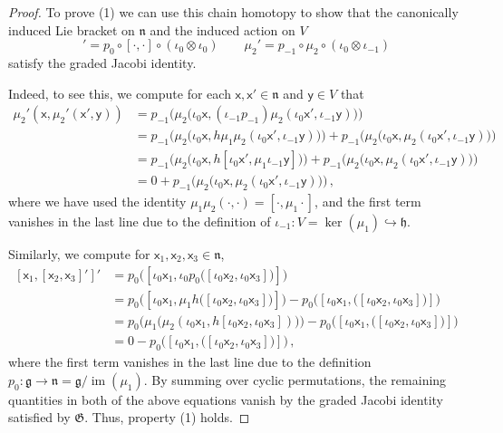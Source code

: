 \documentclass[11pt]{amsart}
\newcommand{\fg}{\mathfrak{g}}
\newcommand{\fn}{\mathfrak{n}}
\newcommand{\fh}{\mathfrak{h}}
\newcommand{\fG}{\mathfrak{G}}
\numberwithin{equation}{section}
\numberwithin{figure}{section}
\numberwithin{table}{section}
\theoremstyle{thm}
\numberwithin{equation}{subsection}
\theoremstyle{definition}
\theoremstyle{rem}
\begin{document}
\begin{proof}


To prove (1) we can use this chain homotopy to show that the canonically induced Lie bracket on $\fn$ and the induced action on $V$ 
\begin{equation}
    [\cdot,\cdot]'=p_0\circ [\cdot,\cdot]\circ(\iota_0\otimes\iota_0) \qquad \mu_2' = p_{-1}\circ \mu_2\circ (\iota_0\otimes\iota_{-1})
\end{equation}
satisfy the graded Jacobi identity. 


Indeed, to see this, we compute for each $\mathsf{x},\mathsf{x}'\in\fn$ and $\mathsf{y}\in V$ that
\begin{equation*}
\begin{split}
    \mu_2'(\mathsf{x},\mu_2'(\mathsf{x}',\mathsf{y})) &= p_{-1}\Big(\mu_2\big(\iota_0\mathsf{x},(\iota_{-1}p_{-1})\mu_2(\iota_0\mathsf{x}',\iota_{-1}\mathsf{y})\big)\Big)\\
    &=p_{-1}\Big(\mu_2\big(\iota_0\mathsf{x},h\mu_1\mu_2(\iota_0\mathsf{x}',\iota_{-1}\mathsf{y})\big)\Big) + p_{-1}\Big(\mu_2\big(\iota_0\mathsf{x},\mu_2(\iota_0\mathsf{x}',\iota_{-1}\mathsf{y})\big)\Big)\\
    &=p_{-1}\Big(\mu_2\big(\iota_0\mathsf{x},h[\iota_0\mathsf{x}',\mu_1\iota_{-1}\mathsf{y}]\big)\Big) + p_{-1}\Big(\mu_2\big(\iota_0\mathsf{x},\mu_2(\iota_0\mathsf{x}',\iota_{-1}\mathsf{y})\big)\Big)\\
    &= 0 + p_{-1}\Big(\mu_2\big(\iota_0\mathsf{x},\mu_2(\iota_0\mathsf{x}',\iota_{-1}\mathsf{y})\big)\Big) \,,
\end{split}
\end{equation*}
where we have used the identity $\mu_1\mu_2(\cdot,\cdot) = [\cdot,\mu_1 \cdot]$, and the first term vanishes in the last line due to the definition of $\iota_{-1}: V=\operatorname{ker}(\mu_1)\hookrightarrow \fh$.

Similarly, we compute for $\mathsf{x}_1,\mathsf{x}_2,\mathsf{x}_3\in\fn$,
\begin{equation*}
\begin{split}
    [\mathsf{x}_1,[\mathsf{x}_2,\mathsf{x}_3]']' &= p_0\Big([\iota_0\mathsf{x}_1,\iota_0p_0\big([\iota_0\mathsf{x}_2,\iota_0\mathsf{x}_3]\big)]\Big) \\ 
    &= p_0\Big([\iota_0\mathsf{x}_1,\mu_1h\big([\iota_0\mathsf{x}_2,\iota_0\mathsf{x}_3]\big)]\Big) - p_0\Big([\iota_0\mathsf{x}_1,\big([\iota_0\mathsf{x}_2,\iota_0\mathsf{x}_3]\big)]\Big) \\
    &= p_0\Big(\mu_1\big(\mu_2(\iota_0\mathsf{x}_1,h[\iota_0\mathsf{x}_2,\iota_0\mathsf{x}_3])\big)\Big) - p_0\Big([\iota_0\mathsf{x}_1,\big([\iota_0\mathsf{x}_2,\iota_0\mathsf{x}_3]\big)]\Big) \\ 
    &= 0 - p_0\Big([\iota_0\mathsf{x}_1,\big([\iota_0\mathsf{x}_2,\iota_0\mathsf{x}_3]\big)]\Big)\,,
\end{split}
\end{equation*}
where the first term vanishes in the last line due to the definition $p_0: \fg\rightarrow \fn=\fg/\operatorname{im}(\mu_1)$. By summing over cyclic permutations, the remaining quantities in both of the above equations vanish by the graded Jacobi identity satisfied by $\fG$. Thus, property (1) holds.


\end{proof}
\end{document}
